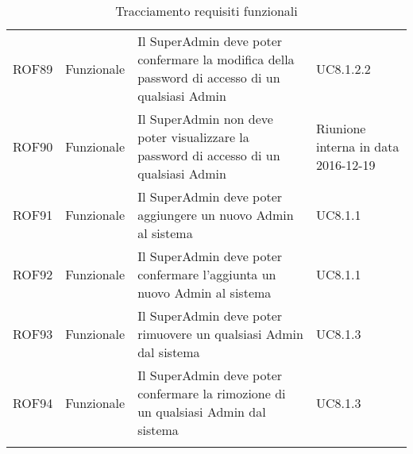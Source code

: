 \documentclass[../AnalisiDeiRequisiti_v4.0.0.tex]{subfiles}
\begin{document}
\begin{longtable}{p{2.5cm}!{\VRule[1pt]}p{2.5cm}!{\VRule[1pt]}p{5cm}!{\VRule[1pt]}p{2.5cm}}
	ROF89&Funzionale\newline  & Il SuperAdmin deve poter confermare la modifica della password di accesso di un qualsiasi Admin & UC8.1.2.2 \\
	ROF90&Funzionale\newline  & Il SuperAdmin non deve poter visualizzare la password di accesso di un qualsiasi Admin & Riunione interna in data 2016-12-19 \\
	ROF91&Funzionale\newline  & Il SuperAdmin deve poter aggiungere un nuovo Admin al sistema & UC8.1.1 \\
	ROF92&Funzionale\newline  & Il SuperAdmin deve poter confermare l'aggiunta un nuovo Admin al sistema & UC8.1.1 \\
	ROF93&Funzionale\newline  & Il SuperAdmin deve poter rimuovere un qualsiasi Admin dal sistema & UC8.1.3 \\
	ROF94&Funzionale\newline  & Il SuperAdmin deve poter confermare la rimozione di un qualsiasi Admin dal sistema & UC8.1.3 \\
	\caption{Tracciamento requisiti funzionali}
	\end{longtable}

	\newpage
\end{document}

